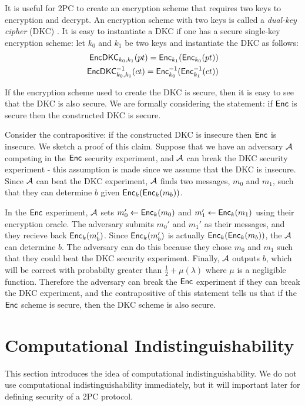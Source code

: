 It is useful for 2PC to create an encryption scheme that requires two keys to encryption and decrypt.
An encryption scheme with two keys is called a \textit{dual-key cipher} (DKC) \cite{bellare2012foundations}.
It is easy to instantiate a DKC if one has a secure single-key encryption scheme: let $k_0$ and $k_1$ be two keys and instantiate the DKC as follows:
\begin{equation}
    \begin{split}
        \textsf{EncDKC}_{k_0, k_1}(pt) = \textsf{Enc}_{k_1} ( \textsf{Enc}_{k_0} ( pt )) \\
        \textsf{EncDKC}^{-1}_{k_0, k_1}(ct) = \textsf{Enc}^{-1}_{k_0} ( \textsf{Enc}^{-1}_{k_1} ( ct )) 
    \end{split}
\end{equation}

If the encryption scheme used to create the DKC is secure, then it is easy to see that the DKC is also secure.
We are formally considering the statement: if $\textsf{Enc}$ is secure then the constructed DKC is secure. 

Consider the contrapositive: if the constructed DKC is insecure then $\textsf{Enc}$ is insecure. 
We sketch a proof of this claim.
Suppose that we have an adversary $\mathcal{A}$ competing in the $\textsf{Enc}$ security experiment, and $\mathcal{A}$ can break the DKC security experiment - this assumption is made since we assume that the DKC is insecure.
Since $\mathcal{A}$ can beat the DKC experiment, $\mathcal{A}$ finds two messages, $m_0$ and $m_1$, such that they can determine $b$ given $\textsf{Enc}_k(\textsf{Enc}_k(m_b))$.

In the $\textsf{Enc}$ experiment, $\mathcal{A}$ sets $m'_0 \gets \textsf{Enc}_k(m_0)$ and $m_1' \gets \textsf{Enc}_k(m_1)$ using their encryption oracle.
The adversary submits $m_0'$ and $m_1'$ as their messages, and they recieve back $\textsf{Enc}_k(m_b')$.
Since $\textsf{Enc}_k(m_b')$ is actually $\textsf{Enc}_k(\textsf{Enc}_k(m_b))$, the $\mathcal{A}$ can determine $b$.
The adversary can do this because they chose $m_0$ and $m_1$ such that they could beat the DKC security experiment.
Finally, $\mathcal{A}$ outputs $b$, which will be correct with probabilty greater than $\frac{1}{2} + \mu(\lambda)$ where $\mu$ is a negligible function.
Therefore the adversary can break the $\textsf{Enc}$ experiment if they can break the DKC experiment, and the contrapositive of this statement tells us that if the $\textsf{Enc}$ scheme is secure, then the DKC scheme is also secure.

\section{Computational Indistinguishability}
This section introduces the idea of computational indistinguishability. 
We do not use computational indistinguishability immediately, but it will important later for defining security of a 2PC protocol.

